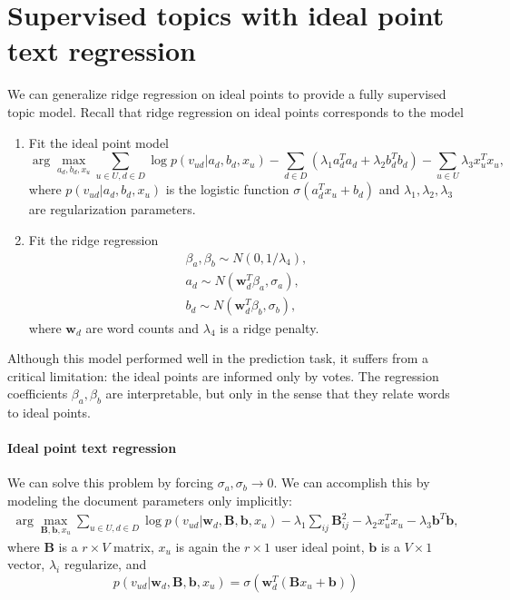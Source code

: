 \section{Supervised topics with ideal point text regression}

We can generalize ridge regression on ideal points to provide a fully
supervised topic model.  Recall that ridge regression on ideal points
corresponds to the model
\begin{enumerate}
  \item Fit the ideal point model \[
    \label{item:ideal_point}
    \arg \max_{a_d, b_d, x_u} \sum_{u \in U, d \in D} \log p(v_{ud} | a_d, b_d, x_u)
    - \sum_{d \in D} (\lambda_1 a_d^T a_d + \lambda_2 b_d^T b_d)
    - \sum_{u \in U} \lambda_3 x_u^T x_u, \]
    where $p(v_{ud} | a_d, b_d, x_u)$ is the logistic function $\sigma(a_d^T x_u + b_d)$
    and $\lambda_1, \lambda_2, \lambda_3$ are regularization
    parameters.
  \item Fit the ridge regression
    \label{item:fit_regression}
    \begin{eqnarray*}
      \beta_a, \beta_b \sim N(0, 1 / \lambda_4), \\
    a_d \sim N(\bm w_d^T \beta_a, \sigma_a), \\
    b_d \sim N(\bm w_d^T \beta_b, \sigma_b),
    \end{eqnarray*}
    where $\bm w_d$ are word counts and $\lambda_4$ is a ridge penalty.
\end{enumerate}
Although this model performed well in the prediction task, it suffers
from a critical limitation: the ideal points are informed only by
votes.  The regression coefficients $\beta_a, \beta_b$ are
interpretable, but only in the sense that they relate words to ideal
points.

\paragraph{Ideal point text regression} We can solve this problem by
forcing $\sigma_a, \sigma_b \rightarrow 0$.  We can accomplish this by
modeling the document parameters only implicitly:
\begin{eqnarray}
    \label{item:ideal_point}
    \arg \max_{\bm B, \bm b, x_u} \sum_{u \in U, d \in D} \log p(v_{ud} | \bm w_d, \bm B, \bm b, x_u) - \lambda_1 \sum_{ij} \bm B_{ij}^2 - \lambda_2 x_u^T x_u - \lambda_3 \bm b^T \bm b,
\end{eqnarray}
where $\bm B$ is a $r \times V$ matrix, $x_u$ is again the $r \times 1$
user ideal point, $\bm b$ is a $V \times 1$ vector, $\lambda_i$ regularize, and 
  \[ p(v_{ud} | \bm w_d, \bm B, \bm b, x_u) = \sigma( \bm w_d^T (\bm B x_u + \bm b) ) \]

